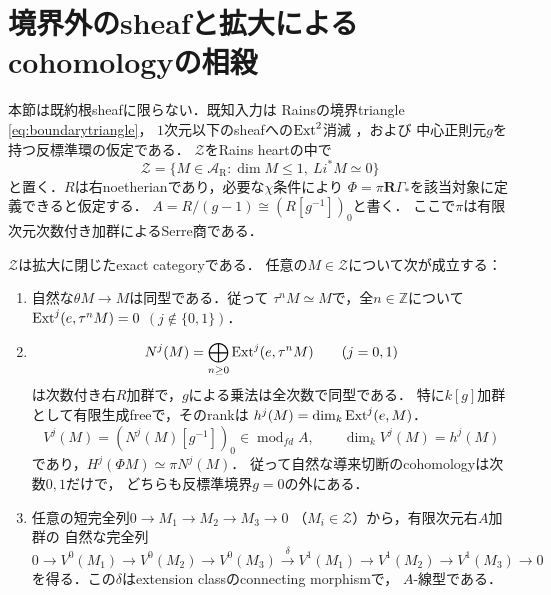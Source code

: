 \section{境界外のsheafと拡大によるcohomologyの相殺}
\label{sec:offboundary-extensions}
本節は既約根sheafに限らない．既知入力は
Rainsの境界triangle \eqref{eq:boundarytriangle}，
$1$次元以下のsheafへの$\operatorname{Ext}^2$消滅
\cite[Corollary 7.23]{RainsBirational}，および
中心正則元$g$を持つ反標準環の仮定である．
$\mathcal Z$をRains heartの中で
\[
 \mathcal Z=\{M\in\mathcal A_{\mathrm R}:
    \dim M\le1,\ Li^*M\simeq0\}
\]
と置く．$R$は右noetherianであり，必要な$\chi$条件により
$\Phi=\pi\mathbf R\Gamma_*$を該当対象に定義できると仮定する．
$A=R/(g-1)\cong (R[g^{-1}])_0$と書く．
ここで$\pi$は有限次元次数付き加群によるSerre商である．

\begin{theorem}[境界外のsheafに対する二項振幅と長完全列]
\label{thm:offboundary-amplitude}
$\mathcal Z$は拡大に閉じたexact categoryである．
任意の$M\in\mathcal Z$について次が成立する：
\begin{enumerate}
\item 自然な$\theta M\to M$は同型である．従って
$\tau^nM\simeq M$で，全$n\in\mathbb Z$について
$\operatorname{Ext}^j(e,\tau^n M)=0$ $(j\notin\{0,1\})$．
\item
\[
 N^j(M)=\bigoplus_{n\ge0}\operatorname{Ext}^j(e,\tau^nM)
 \qquad(j=0,1)
\]
は次数付き右$R$加群で，$g$による乗法は全次数で同型である．
特に$k[g]$加群として有限生成freeで，そのrankは
$h^j(M)=\dim_k\operatorname{Ext}^j(e,M)$．
\[
 V^j(M)=(N^j(M)[g^{-1}])_0\in\operatorname{mod}_{fd}A,
 \qquad \dim_kV^j(M)=h^j(M)
\]
であり，$H^j(\Phi M)\simeq\pi N^j(M)$．
従って自然な導来切断のcohomologyは次数$0,1$だけで，
どちらも反標準境界$g=0$の外にある．
\item 任意の短完全列$0\to M_1\to M_2\to M_3\to0$
（$M_i\in\mathcal Z$）から，有限次元右$A$加群の
自然な完全列
\begin{equation}\label{eq:offboundary-six}
0\to V^0(M_1)\to V^0(M_2)\to V^0(M_3)
\xrightarrow{\delta} V^1(M_1)
\to V^1(M_2)\to V^1(M_3)\to0
\end{equation}
を得る．この$\delta$はextension classのconnecting morphismで，
$A$-線型である．
\end{enumerate}
\end{theorem}
